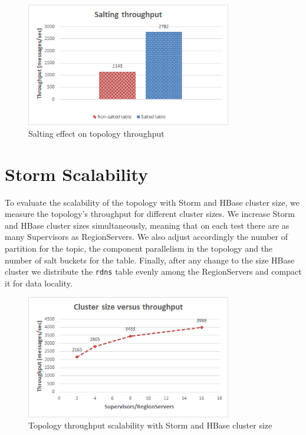 \begin{figure}[H]
\centering
\includegraphics[width=0.8\textwidth]{figures/benchmarks_storm_salting_throughput}
\caption{Salting effect on topology throughput}
\label{figure:benchmarks_storm_salting_throughput}
\end{figure}


\section{Storm Scalability}\label{section:benchmarks_storm_scalability}

To evaluate the scalability of the topology with Storm and HBase cluster size, we measure the topology's throughput for different cluster sizes. We increase Storm and HBase cluster sizes simultaneously, meaning that on each test there are as many Supervisors as RegionServers. We also adjust accordingly the number of partition for the topic, the component parallelism in the topology and the number of salt buckets for the table. Finally, after any change to the size HBase cluster we distribute the \texttt{rdns} table evenly among the RegionServers and compact it for data locality.

\begin{figure}[H]
\centering
\includegraphics[width=0.8\textwidth]{figures/benchmarks_storm_scalability_throughput}
\caption{Topology throughput scalability with Storm and HBase cluster size}
\label{figure:benchmarks_storm_scalability_throughput}
\end{figure}

